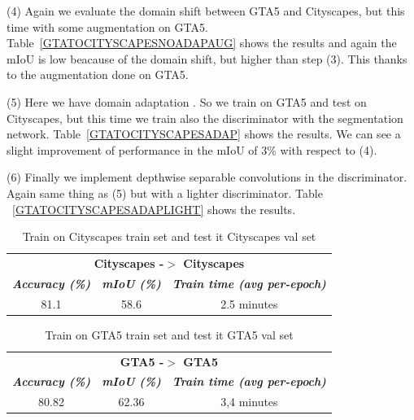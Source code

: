 \documentclass[conference]{IEEEtran}
\begin{document}
(4) Again we evaluate the domain shift between GTA5 and Cityscapes, but this time with some augmentation on GTA5. Table~\ref{GTATOCITYSCAPESNOADAPAUG}
shows the results and again the mIoU is low beacause of the domain shift, but higher than step (3). This thanks to the augmentation 
done on GTA5.

(5) Here we have domain adaptation \cite{b3}. So we train on GTA5 and test on Cityscapes, but this time we train also the discriminator
with the segmentation network. Table~\ref{GTATOCITYSCAPESADAP} shows the results. We can see a slight improvement of performance
in the mIoU of 3\% with respect to (4).

(6) Finally we implement depthwise separable convolutions in the discriminator. Again same thing as (5) but with a lighter discriminator. Table
~\ref{GTATOCITYSCAPESADAPLIGHT} shows the results. 



\begin{table}[tb]
\caption{Train on Cityscapes train set and test it Cityscapes val set}
\begin{center}
\begin{tabular}{|c|c|c|}
\hline
\multicolumn{3}{|c|}{\textbf{Cityscapes -$>$ Cityscapes}} \\
\cline{1-3} 
\textbf{\textit{Accuracy (\%)}}& \textbf{\textit{mIoU (\%)}}& \textbf{\textit{Train time (avg per-epoch)}} \\
\hline
81.1& 58.6& 2.5 minutes   \\
\hline
\end{tabular}
\label{CityscapesToCityscapes}
\end{center}
\end{table}

\begin{table}[tb]
\caption{Train on GTA5 train set and test it GTA5 val set}
\begin{center}
\begin{tabular}{|c|c|c|}
\hline
\multicolumn{3}{|c|}{\textbf{GTA5 -$>$ GTA5}} \\
\cline{1-3} 
\textbf{\textit{Accuracy (\%)}}& \textbf{\textit{mIoU (\%)}}& \textbf{\textit{Train time (avg per-epoch)}} \\
\hline
80.82& 62.36& 3,4 minutes   \\
\hline
\end{tabular}
\label{GTATOGTA}
\end{center}
\end{table}
\end{document}
